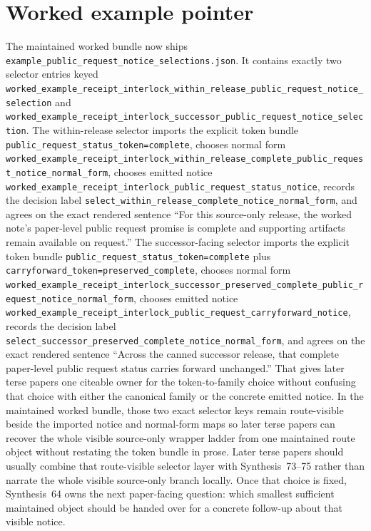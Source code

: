 \documentclass[11pt]{article}
\begin{document}
\section{Worked example pointer}
The maintained worked bundle now ships \nolinkurl{example_public_request_notice_selections.json}.\cite{series:workedexample}
It contains exactly two selector entries keyed \nolinkurl{worked_example_receipt_interlock_within_release_public_request_notice_selection} and \nolinkurl{worked_example_receipt_interlock_successor_public_request_notice_selection}.
The within-release selector imports the explicit token bundle \nolinkurl{public_request_status_token=complete}, chooses normal form \nolinkurl{worked_example_receipt_interlock_within_release_complete_public_request_notice_normal_form}, chooses emitted notice \nolinkurl{worked_example_receipt_interlock_public_request_status_notice}, records the decision label \nolinkurl{select_within_release_complete_notice_normal_form}, and agrees on the exact rendered sentence ``For this source-only release, the worked note's paper-level public request promise is complete and supporting artifacts remain available on request.''
The successor-facing selector imports the explicit token bundle \nolinkurl{public_request_status_token=complete} plus \nolinkurl{carryforward_token=preserved_complete}, chooses normal form \nolinkurl{worked_example_receipt_interlock_successor_preserved_complete_public_request_notice_normal_form}, chooses emitted notice \nolinkurl{worked_example_receipt_interlock_public_request_carryforward_notice}, records the decision label \nolinkurl{select_successor_preserved_complete_notice_normal_form}, and agrees on the exact rendered sentence ``Across the canned successor release, that complete paper-level public request status carries forward unchanged.''
That gives later terse papers one citeable owner for the token-to-family choice without confusing that choice with either the canonical family or the concrete emitted notice. In the maintained worked bundle, those two exact selector keys remain route-visible beside the imported notice and normal-form maps so later terse papers can recover the whole visible source-only wrapper ladder from one maintained route object without restating the token bundle in prose. Later terse papers should usually combine that route-visible selector layer with Synthesis~73--75 rather than narrate the whole visible source-only branch locally.\cite{series:publicrequestresponsepacketrefreshresponsepacketclosureverdicts,series:pairedterminalcitationdiscipline,series:pairedterminalcutoverrule}
Once that choice is fixed, Synthesis~64 owns the next paper-facing question: which smallest sufficient maintained object should be handed over for a concrete follow-up about that visible notice.
\end{document}
